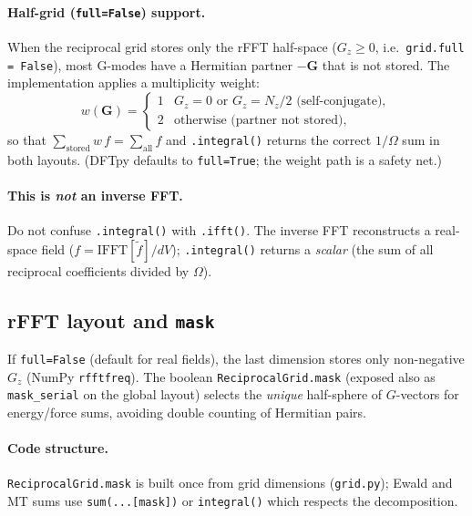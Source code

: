 \documentclass[11pt,a4paper]{article}
\begin{document}
\paragraph{Half-grid (\texttt{full=False}) support.}
When the reciprocal grid stores only the rFFT half-space ($G_z \ge 0$, i.e.\
\texttt{grid.full = False}), most G-modes have a Hermitian partner $-\mathbf G$
that is not stored. The implementation applies a multiplicity weight:
\begin{equation}
  w(\mathbf G) = \begin{cases}
    1 & G_z = 0 \text{ or } G_z = N_z/2 \text{ (self-conjugate)},\\
    2 & \text{otherwise (partner not stored)},
  \end{cases}
\end{equation}
so that $\sum_{\text{stored}} w\,f = \sum_{\text{all}} f$ and \texttt{.integral()}
returns the correct $1/\Omega$ sum in both layouts. (DFTpy defaults to
\texttt{full=True}; the weight path is a safety net.)

\paragraph{This is \emph{not} an inverse FFT.}
Do not confuse \texttt{.integral()} with \texttt{.ifft()}.
The inverse FFT reconstructs a real-space field ($f = \mathrm{IFFT}[\tilde f]/dV$);
\texttt{.integral()} returns a \emph{scalar} (the sum of all reciprocal coefficients
divided by $\Omega$).

\subsection{rFFT layout and \texttt{mask}}

If \texttt{full=False} (default for real fields), the last dimension stores only
non-negative $G_z$ (NumPy \texttt{rfftfreq}). The boolean \texttt{ReciprocalGrid.mask}
(exposed also as \texttt{mask\_serial} on the global layout) selects the
\emph{unique} half-sphere of $G$-vectors for energy/force sums, avoiding double counting
of Hermitian pairs.

\paragraph{Code structure.}
\texttt{ReciprocalGrid.mask} is built once from grid dimensions (\texttt{grid.py});
Ewald and MT sums use \texttt{sum(...[mask])} or \texttt{integral()} which respects the decomposition.
\end{document}
